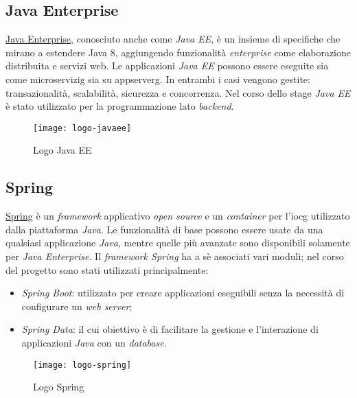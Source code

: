 \subsection{Java Enterprise}
\href{https://www.oracle.com/it/java/technologies/java-ee-glance.html}{Java Enterprise}, conosciuto anche come \textit{Java EE}, è un insieme di specifiche che mirano a estendere Java 8, aggiungendo funzionalità \textit{enterprise} come elaborazione distribuita e servizi web. Le applicazioni \textit{Java EE} possono essere eseguite sia come \gls{microservizig}\glsfirstoccur{} sia su \gls{appserverg}\glsfirstoccur{}. In entrambi i casi vengono gestite: transazionalità, scalabilità, sicurezza e concorrenza.
Nel corso dello stage \textit{Java EE} è stato utilizzato per la programmazione lato \textit{backend}.
\begin{figure}[h]
    \begin{center}
    \texttt{[image: logo-javaee]}
    \caption{Logo Java EE}
    \label{fig:figure3}
    \end{center}
\end{figure}

\subsection{Spring}
\href{https://spring.io/}{Spring} è un \textit{framework} applicativo \textit{open source} e un \textit{container} per l'\gls{iocg}\glsfirstoccur{} utilizzato dalla piattaforma \textit{Java}. Le funzionalità di base possono essere usate da una qualsiasi applicazione \textit{Java}, mentre quelle più avanzate sono disponibili solamente per \textit{Java Enterprise}.
Il \textit{framework Spring} ha a sè associati vari moduli; nel corso del progetto sono stati utilizzati principalmente:
\begin{itemize}
    \item \textit{Spring Boot}: utilizzato per creare applicazioni eseguibili senza la necessità di configurare un \textit{web server};
    \item \textit{Spring Data}: il cui obiettivo è di facilitare la gestione e l'interazione di applicazioni \textit{Java} con un \textit{database}.
\end{itemize}
\begin{figure}[h]
    \begin{center}
    \texttt{[image: logo-spring]}
    \caption{Logo Spring}
    \label{fig:figure4}
    \end{center}
\end{figure}

